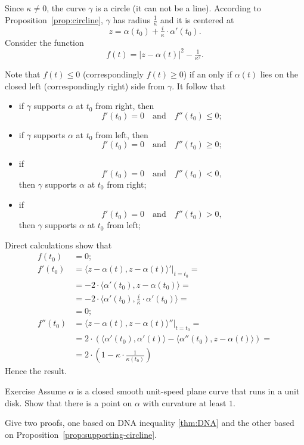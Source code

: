 Since $\kappa\ne0$, the curve $\gamma$ is a circle (it can not be a line).
According to Proposition~\ref{prop:circline},
$\gamma$ has radius $\tfrac1\kappa$ and it is centered at 
\[z=\alpha(t_0)+\tfrac i\kappa\cdot \alpha'(t_0).\]
Consider the function 
\[f(t)=|z-\alpha(t)|^2-\tfrac1{\kappa^2}.\]

Note that $f(t)\le0$ (correspondingly $f(t)\ge0$) 
if an only if $\alpha(t)$ lies on the closed left (correspondingly right) side from $\gamma$.
It follow that 
\begin{itemize}
\item if $\gamma$ supports $\alpha$ at $t_0$ from right, 
then
\[f'(t_0)=0\quad\text{and}\quad f''(t_0)\le 0;\]

\item if $\gamma$ supports $\alpha$ at $t_0$ from  left, 
then 
\[f'(t_0)=0\quad\text{and}\quad f''(t_0)\ge 0;\]

\item if 
\[f'(t_0)=0\quad\text{and}\quad f''(t_0)< 0,\]
then $\gamma$ supports $\alpha$ at $t_0$ from  right;

\item if 
\[f'(t_0)=0\quad\text{and}\quad f''(t_0)> 0,\] then $\gamma$ supports $\alpha$ at $t_0$ from  left;
\end{itemize}

Direct calculations show that
\begin{align*}
f(t_0)&=0;
\\
f'(t_0)&=\left.\langle z-\alpha(t),z-\alpha(t) \rangle'\right|_{t=t_0}=
\\
&=-2\cdot \langle \alpha'(t_0),z-\alpha(t_0) \rangle=
\\&=-2\cdot \langle \alpha'(t_0),\tfrac i\kappa \cdot\alpha'(t_0) \rangle=
\\
&=0;
\\
f''(t_0)&=\langle z-\alpha(t),z-\alpha(t) \rangle''|_{t=t_0}=
\\
&=2\cdot\left( \langle \alpha'(t_0),\alpha'(t) \rangle-\langle \alpha''(t_0),z-\alpha(t) \rangle \right)=
\\
&=2\cdot\left(1-\kappa\cdot \frac1{\kappa(t_0)}\right)
\end{align*}
Hence the result.\qeds


\begin{thm}{Exercise}
Assume $\alpha$ is a closed smooth unit-speed plane curve that runs in a unit disk.
Show that there is a point on $\alpha$ with curvature at least $1$.

Give two proofs, one based on DNA inequality \ref{thm:DNA} and the other based on Proposition~\ref{prop:supporting-circline}.
\end{thm}

